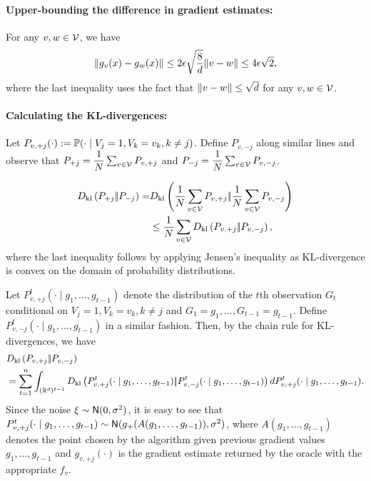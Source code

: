 
\paragraph{Upper-bounding the difference in gradient estimates:}

For any $v,w \in \V$, we have
\begin{align}
 \norm{g_v(x) - g_w(x)} \le 2 \epsilon \sqrt{\dfrac{8}{d}} \norm{v - w} \le 4\epsilon\sqrt{2},    \label{eq:gdiff-ub}
\end{align}
where the last inequality uses the fact that $\norm{v - w} \le \sqrt d$ for any $v,w \in \V$.



\paragraph{Calculating the KL-divergences:}
Let $P_{v,+j}(\cdot) := \P(\cdot \mid V_j=1, V_k=v_k, k \ne j)$. Define $P_{v,-j}$ along similar lines and observe that 
$P_{+j} = \dfrac1{N} \sum_{v\in\V} P_{v,+j}$ and $P_{-j} = \dfrac1{N} \sum_{v\in\V} P_{v,-j}$.

\begin{align}
  \dkl{P_{+j}}{P_{-j}} = & \dkl{\dfrac1{N} \sum_{v \in \V} P_{v,+j}}{\dfrac1{N} \sum_{v \in \V} P_{v,-j}} \nonumber\\ 
  & \le \frac{1}{N}  \sum_{v \in \V}  \dkl{P_{v,+j}}{P_{v,-j}}, \label{eq:jie} 
\end{align}  
where the last inequality follows by applying Jensen's inequality as KL-divergence is convex on the domain of probability distributions.  

Let $P_{v,+j}^t(\cdot\mid g_1,\ldots,g_{t-1})$ denote the distribution of the $t$th observation $G_t$ conditional on $V_j=1, V_k=v_k, k\ne j$ and $G_1=g_1,\ldots,G_{t-1}=g_{t-1}$. Define  $P_{v,-j}^t(\cdot\mid g_1,\ldots,g_{t-1})$ in a similar fashion.
Then, by the chain rule for KL-divergences, we have
\begin{align}
&\dkl{P_{v,+j}}{P_{v,-j}}\nonumber\\ 
&= \sum_{t=1}^n \int_{(\R^d)^{t-1}} \dkl{P_{v,+j}^t(\cdot\mid g_1,\ldots,g_{t-1})}{P_{v,-j}^t(\cdot\mid g_1,\ldots,g_{t-1})} d P_{v,+j}^t(\cdot\mid g_1,\ldots,g_{t-1}).\label{eq:dklchain}
\end{align}
Since the noise $\xi \sim \normal(0,\sigma^2)$, it is easy to see that $P_{v,+j}^t(\cdot\mid g_1,\ldots,g_{t-1}) \sim \normal(g_{+}(A(g_1,\ldots,g_{t-1})),\sigma^2)$, where $A(g_1,\ldots,g_{t-1})$ denotes the point chosen by the algorithm given previous gradient values $g_1,\ldots, g_{t-1}$ and $g_{v,+j}(\cdot)$ is the gradient estimate returned by the oracle with the appropriate $f_v$. 

